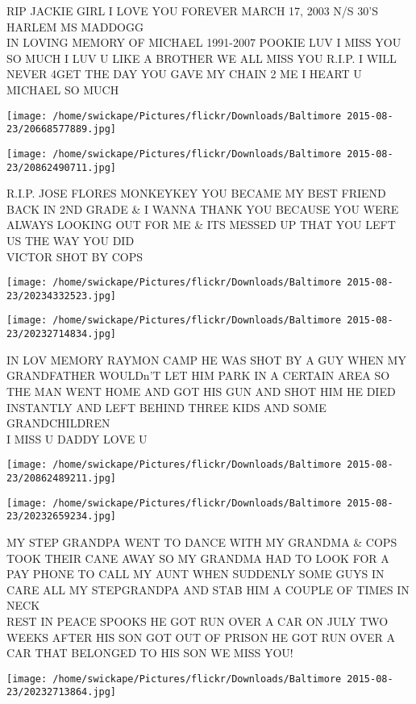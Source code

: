 \documentclass[10pt,letterpaper]{article}
\begin{document}
RIP JACKIE GIRL I LOVE YOU FOREVER MARCH 17, 2003 N/S 30'S HARLEM MS MADDOGG\\
IN LOVING MEMORY OF MICHAEL 1991{-}2007 POOKIE LUV I MISS YOU SO MUCH I LUV U LIKE A BROTHER WE ALL MISS YOU R.I.P. I WILL NEVER 4GET THE DAY YOU GAVE MY CHAIN 2 ME I HEART U MICHAEL SO MUCH
\pagebreak

\texttt{[image: /home/swickape/Pictures/flickr/Downloads/Baltimore 2015-08-23/20668577889.jpg]}

\vspace{0.25in}
\texttt{[image: /home/swickape/Pictures/flickr/Downloads/Baltimore 2015-08-23/20862490711.jpg]}

R.I.P. JOSE FLORES MONKEYKEY YOU BECAME MY BEST FRIEND BACK IN 2ND GRADE \& I WANNA THANK YOU BECAUSE YOU WERE ALWAYS LOOKING OUT FOR ME \& ITS MESSED UP THAT YOU LEFT US THE WAY YOU DID\\
VICTOR SHOT BY COPS
\pagebreak

\texttt{[image: /home/swickape/Pictures/flickr/Downloads/Baltimore 2015-08-23/20234332523.jpg]}

\vspace{0.25in}
\texttt{[image: /home/swickape/Pictures/flickr/Downloads/Baltimore 2015-08-23/20232714834.jpg]}

IN LOV MEMORY RAYMON CAMP HE WAS SHOT BY A GUY WHEN MY GRANDFATHER WOULDn'T LET HIM PARK IN A CERTAIN AREA SO THE MAN WENT HOME AND GOT HIS GUN AND SHOT HIM HE DIED INSTANTLY AND LEFT BEHIND THREE KIDS AND SOME GRANDCHILDREN\\
I MISS U DADDY LOVE U
\pagebreak

\texttt{[image: /home/swickape/Pictures/flickr/Downloads/Baltimore 2015-08-23/20862489211.jpg]}

\vspace{0.25in}
\texttt{[image: /home/swickape/Pictures/flickr/Downloads/Baltimore 2015-08-23/20232659234.jpg]}

MY STEP GRANDPA WENT TO DANCE WITH MY GRANDMA \& COPS TOOK THEIR CANE AWAY SO MY GRANDMA HAD TO LOOK FOR A PAY PHONE TO CALL MY AUNT WHEN SUDDENLY SOME GUYS IN CARE ALL MY STEPGRANDPA AND STAB HIM A COUPLE OF TIMES IN NECK\\
REST IN PEACE SPOOKS HE GOT RUN OVER A CAR ON JULY TWO WEEKS AFTER HIS SON GOT OUT OF PRISON HE GOT RUN OVER A CAR THAT BELONGED TO HIS SON WE MISS YOU!
\pagebreak

\texttt{[image: /home/swickape/Pictures/flickr/Downloads/Baltimore 2015-08-23/20232713864.jpg]}
\end{document}
